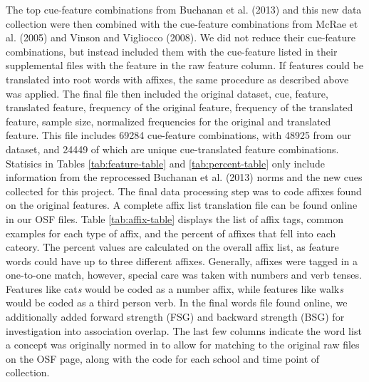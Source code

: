 \documentclass[english,man]{apa6}
\theoremstyle{definition}
\theoremstyle{definition}
\theoremstyle{definition}
\theoremstyle{remark}
\begin{document}
The top cue-feature combinations from Buchanan et al. (2013) and this
new data collection were then combined with the cue-feature combinations
from McRae et al. (2005) and Vinson and Vigliocco (2008). We did not
reduce their cue-feature combinations, but instead included them with
the cue-feature listed in their supplemental files with the feature in
the raw feature column. If features could be translated into root words
with affixes, the same procedure as described above was applied. The
final file then included the original dataset, cue, feature, translated
feature, frequency of the original feature, frequency of the translated
feature, sample size, normalized frequencies for the original and
translated feature. This file includes 69284 cue-feature combinations,
with 48925 from our dataset, and 24449 of which are unique
cue-translated feature combinations. Statisics in Tables
\ref{tab:feature-table} and \ref{tab:percent-table} only include
information from the reprocessed Buchanan et al. (2013) norms and the
new cues collected for this project. The final data processing step was
to code affixes found on the original features. A complete affix list
translation file can be found online in our OSF files. Table
\ref{tab:affix-table} displays the list of affix tags, common examples
for each type of affix, and the percent of affixes that fell into each
cateory. The percent values are calculated on the overall affix list, as
feature words could have up to three different affixes. Generally,
affixes were tagged in a one-to-one match, however, special care was
taken with numbers and verb tenses. Features like cat\emph{s} would be
coded as a number affix, while features like walk\emph{s} would be coded
as a third person verb. In the final words file found online, we
additionally added forward strength (FSG) and backward strength (BSG)
for investigation into association overlap. The last few columns
indicate the word list a concept was originally normed in to allow for
matching to the original raw files on the OSF page, along with the code
for each school and time point of collection.
\end{document}
